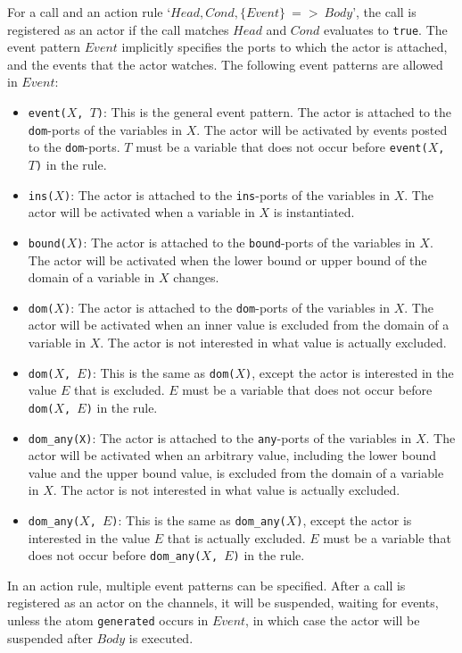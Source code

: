 For a call and an action rule `$Head, Cond, \{Event\}\ $$=$$>$$\ Body$', the call is registered as an actor if the call matches $Head$ and $Cond$ evaluates to \texttt{true}. The event pattern $Event$ implicitly specifies the ports to which the actor is attached, and the events that the actor watches. The following event patterns are allowed in $Event$:
\begin{itemize}
\item \texttt{event($X$, $T$)}: This is the general event pattern. The actor is attached to the \texttt{dom}-ports of the variables in $X$.  The actor will be activated by events posted to the \texttt{dom}-ports. $T$ must be a variable that does not occur before \texttt{event($X$, $T$)} in the rule.
\item \texttt{ins($X$)}: The actor is attached to the \texttt{ins}-ports of the variables in $X$.  The actor will be activated when a variable in $X$ is instantiated.
\item \texttt{bound($X$)}: The actor is attached to the \texttt{bound}-ports of the variables in $X$.  The actor will be activated when the lower bound or upper bound of the domain of a variable in $X$ changes.
\item \texttt{dom($X$)}: The actor is attached to the \texttt{dom}-ports of the variables in $X$.  The actor will be activated when an inner value is excluded from the domain of a variable in $X$. The actor is not interested in what value is actually excluded.
\item \texttt{dom($X$, $E$)}: This is the same as \texttt{dom($X$)}, except the actor is interested in the value $E$ that is excluded. $E$ must be a variable that does not occur before \texttt{dom($X$, $E$)} in the rule.
\item \texttt{dom\_any(X)}: The actor is attached to the \texttt{any}-ports of the variables in $X$.  The actor will be activated when an arbitrary value, including the lower bound value and the upper bound value, is excluded from the domain of a variable in $X$.  The actor is not interested in what value is actually excluded. 
\item \texttt{dom\_any($X$, $E$)}: This is the same as \texttt{dom\_any($X$)}, except the actor is interested in the value $E$ that is actually excluded. $E$ must be a variable that does not occur before \texttt{dom\_any($X$, $E$)} in the rule.
\end{itemize}
In an action rule, multiple event patterns can be specified.  After a call is registered as an actor on the channels, it will be suspended, waiting for events, unless the atom \texttt{generated} occurs in $Event$, in which case the actor will be suspended after $Body$ is executed.

